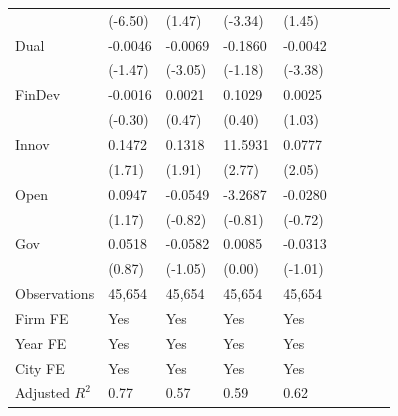 \begin{table}[htbp]
\begin{tabularx}{\textwidth}{lYYYYYYYY@{}}
                &  (-6.50)         &   (1.47)         &  (-3.34)         &   (1.45)         \\
Dual            &  -0.0046         &  -0.0069\sym{***}&  -0.1860         &  -0.0042\sym{***}\\
                &  (-1.47)         &  (-3.05)         &  (-1.18)         &  (-3.38)         \\
FinDev          &  -0.0016         &   0.0021         &   0.1029         &   0.0025         \\
                &  (-0.30)         &   (0.47)         &   (0.40)         &   (1.03)         \\
Innov           &   0.1472\sym{*}  &   0.1318\sym{*}  &  11.5931\sym{***}&   0.0777\sym{**} \\
                &   (1.71)         &   (1.91)         &   (2.77)         &   (2.05)         \\
Open            &   0.0947         &  -0.0549         &  -3.2687         &  -0.0280         \\
                &   (1.17)         &  (-0.82)         &  (-0.81)         &  (-0.72)         \\
Gov             &   0.0518         &  -0.0582         &   0.0085         &  -0.0313         \\
                &   (0.87)         &  (-1.05)         &   (0.00)         &  (-1.01)         \\
\hline
Observations    &   45,654         &   45,654         &   45,654         &   45,654         \\
Firm FE         &      Yes         &      Yes         &      Yes         &      Yes         \\
Year FE         &      Yes         &      Yes         &      Yes         &      Yes         \\
City FE         &      Yes         &      Yes         &      Yes         &      Yes         \\
Adjusted $ R^2$ &     0.77         &     0.57         &     0.59         &     0.62         \\
\bottomrule
\end{tabularx}
\end{table}
